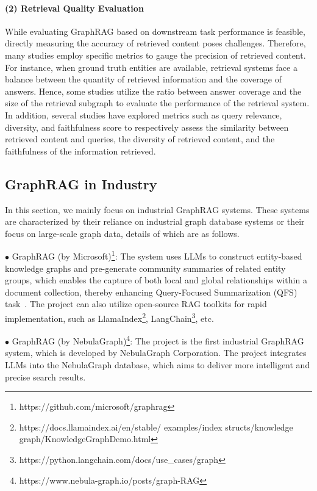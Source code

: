 \documentclass[acmsmall]{acmart}
\begin{document}
\paragraph{(2) Retrieval Quality Evaluation}
While evaluating GraphRAG based on downstream task performance is feasible, directly measuring the accuracy of retrieved content poses challenges. Therefore, many studies employ specific metrics to gauge the precision of retrieved content. For instance, when ground truth entities are available, retrieval systems face a balance between the quantity of retrieved information and the coverage of answers. Hence, some studies utilize the ratio between answer coverage and the size of the retrieval subgraph to evaluate the performance of the retrieval system. In addition, several studies have explored metrics such as query relevance, diversity, and faithfulness score to respectively assess the similarity between retrieved content and queries, the diversity of retrieved content, and the faithfulness of the information retrieved.

\subsection{GraphRAG in Industry}
In this section, we mainly focus on industrial GraphRAG systems. These systems are characterized by their reliance on industrial graph database systems or their focus on large-scale graph data, details of which are as follows.

$\bullet$ GraphRAG (by Microsoft)\footnote{https://github.com/microsoft/graphrag}: The system uses LLMs to construct entity-based knowledge graphs and pre-generate community summaries of related entity groups, which enables the capture of both local and global relationships within a document collection, thereby enhancing Query-Focused Summarization (QFS) task~\cite{ref:graphrag}. The project can also utilize open-source RAG toolkits for rapid implementation, such as LlamaIndex\footnote{https://docs.llamaindex.ai/en/stable/ examples/index structs/knowledge graph/KnowledgeGraphDemo.html}, LangChain\footnote{https://python.langchain.com/docs/use\_cases/graph}, etc.

$\bullet$ GraphRAG (by NebulaGraph)\footnote{https://www.nebula-graph.io/posts/graph-RAG}: The project is the first industrial GraphRAG system, which is developed by NebulaGraph Corporation. The project integrates LLMs into the NebulaGraph database, which aims to deliver more intelligent and precise search results.
\end{document}
